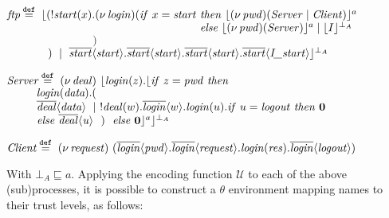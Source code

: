 \documentclass[10pt,a4paper,final,oneside,fleqn]{book}
\newcommand*{\eqdef}{\mathbin{\mathop{=}\limits^{\texttt{def}}}}
\begin{document}
\noindent
$\mbox{{\itshape ftp\/}}\eqdef~\lfloor(!\mbox{{\itshape start\/}}(x).(\nu~\!\mbox{{\itshape login\/}})(\mbox{{\itshape if\/} }x=\mbox{{\itshape start\/}}\mbox{ {\itshape then\/} }\lfloor(\nu~\!\mbox{{\itshape pwd\/}})(\mbox{{\itshape Server\/}}\mid\mbox{{\itshape Client\/}})\rfloor^a$\\
$~~~~~~~~~~~~~~~~~~~~~~~~~~~~~~~~~~~~~~~~~~~~~~~~~~~\mbox{ {\itshape else\/} }\lfloor(\nu~\!\mbox{{\itshape pwd\/}})(\mbox{{\itshape Server\/}})\rfloor^a\mid\lfloor I\rfloor^{\bot_A}$\\
$~~~~~~~~~~~~~~~~~~~~~~~~~~~~~~~~~~~)$\\
$~~~~~~~~~~~)~\mid~\overline{\mbox{{\itshape start\/}}}\langle\mbox{{\itshape start\/}}\rangle.\overline{\mbox{{\itshape start\/}}}\langle\mbox{{\itshape start\/}}\rangle.\overline{\mbox{{\itshape start\/}}}\langle\mbox{{\itshape start\/}}\rangle.\overline{\mbox{{\itshape start\/}}}\langle\mbox{{\itshape I\_start\/}}\rangle\rfloor^{\bot_A}$\vspace{6mm}

\noindent
$\mbox{{\itshape Server\/}}\eqdef~(\nu~\!\mbox{{\itshape deal\/}})~\lfloor\mbox{{\itshape login\/}}(z).\lfloor\mbox{{\itshape if\/} }z=\mbox{{\itshape pwd\/} }\mbox{{\itshape then\/}}$\\
$~~~~~~~~\mbox{{\itshape login\/}}(\mbox{{\itshape data}}).($\\
$~~~~~~~~\overline{\mbox{{\itshape deal\/}}}\langle\mbox{{\itshape data\/}}\rangle~\mid~!\mbox{{\itshape deal\/}}(w).\overline{\mbox{{\itshape login\/}}}\langle w\rangle.\mbox{{\itshape login\/}}(u).\mbox{{\itshape if\/} }u=\mbox{{\itshape logout\/} }\mbox{{\itshape then\/} }{\bf 0}$\\
$~~~~~~~~\mbox{{\itshape else\/} }\overline{\mbox{{\itshape deal\/}}}\langle\mbox{{\itshape u\/}}\rangle~~)~~\mbox{{\itshape else\/} }{\bf 0}\rfloor^a\rfloor^{\bot_A}$\vspace{6mm}

\noindent
$\mbox{{\itshape Client\/}}\eqdef~(\nu~\!\mbox{{\itshape request\/}})~(\overline{\mbox{{\itshape login\/}}}\langle\mbox{{\itshape pwd\/}}\rangle.\overline{\mbox{{\itshape login\/}}}\langle\mbox{{\itshape request\/}}\rangle.\mbox{{\itshape login\/}}(\mbox{{\itshape res\/}}).\overline{\mbox{{\itshape login\/}}}\langle\mbox{{\itshape logout\/}}\rangle)$\vspace{6mm}

\noindent
With $\bot_A\sqsubseteq a$. Applying the encoding function $\mathcal{U}$ to each of the above (sub)processes, it is possible to construct a $\theta$ environment mapping names to their trust levels, as follows:\vspace{5mm}
\end{document}
